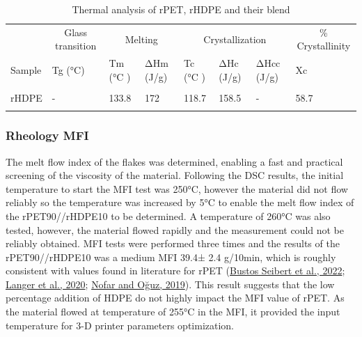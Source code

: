 \documentclass[
  12pt,
]{article}
\begin{document}
\begin{table}
\caption{Thermal analysis of rPET, rHDPE and their blend}\tabularnewline

\centering\begingroup\fontsize{8}{10}\selectfont

\begin{tabular}[t]{llllllll}
\toprule
\multicolumn{1}{c}{ } & \multicolumn{1}{c}{Glass transition} & \multicolumn{2}{c}{Melting} & \multicolumn{3}{c}{Crystallization } & \multicolumn{1}{c}{\% Crystallinity} \\
\cmidrule(l{3pt}r{3pt}){2-2} \cmidrule(l{3pt}r{3pt}){3-4} \cmidrule(l{3pt}r{3pt}){5-7} \cmidrule(l{3pt}r{3pt}){8-8}
Sample & Tg (°C) & Tm  (°C ) & ΔHm (J/g) & Tc  (°C ) & ΔHc (J/g) & ΔHcc (J/g) & Xc\\
\midrule
\cellcolor{gray!6}{rPET} & \cellcolor{gray!6}{82} & \cellcolor{gray!6}{249.9} & \cellcolor{gray!6}{31.6} & \cellcolor{gray!6}{196.7} & \cellcolor{gray!6}{34.8} & \cellcolor{gray!6}{-} & \cellcolor{gray!6}{22.6}\\
rHDPE & - & 133.8 & 172 & 118.7 & 158.5 & - & 58.7\\
\cellcolor{gray!6}{rPET90/rHDPE10} & \cellcolor{gray!6}{77 / -} & \cellcolor{gray!6}{254/131.7} & \cellcolor{gray!6}{40.3/1.30} & \cellcolor{gray!6}{210.6/117.4} & \cellcolor{gray!6}{37.9/6.7} & \cellcolor{gray!6}{6.8} & \cellcolor{gray!6}{24.8 / 18.4}\\
\bottomrule
\end{tabular}
\endgroup{}
\end{table}

\hypertarget{rheology-mfi}{%
\subsubsection{Rheology MFI}\label{rheology-mfi}}

The melt flow index of the flakes was determined, enabling a fast and
practical screening of the viscosity of the material. Following the DSC
results, the initial temperature to start the MFI test was 250°C,
however the material did not flow reliably so the temperature was
increased by 5°C to enable the melt flow index of the rPET90//rHDPE10 to
be determined. A temperature of 260°C was also tested, however, the
material flowed rapidly and the measurement could not be reliably
obtained. MFI tests were performed three times and the results of the
rPET90//rHDPE10 was a medium MFI 39.4± 2.4 g/10min, which is roughly
consistent with values found in literature for rPET
(\protect\hyperlink{ref-bustosseibert2022}{Bustos Seibert et al., 2022};
\protect\hyperlink{ref-Langer2020}{Langer et al., 2020};
\protect\hyperlink{ref-nofar2019}{Nofar and Oğuz, 2019}). This result
suggests that the low percentage addition of HDPE do not highly impact
the MFI value of rPET. As the material flowed at temperature of 255°C in
the MFI, it provided the input temperature for 3-D printer parameters
optimization.
\end{document}

